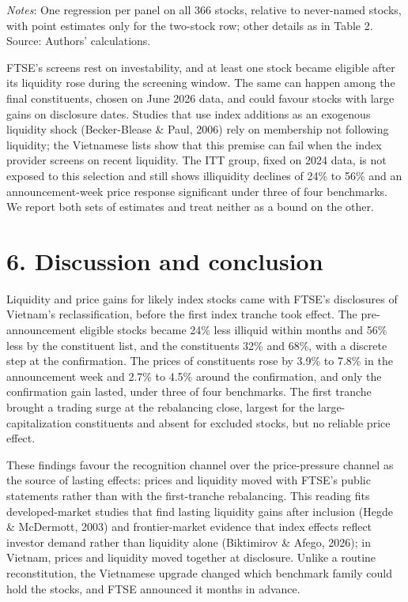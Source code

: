 \emph{Notes}: One regression per panel on all 366 stocks, relative to
never-named stocks, with point estimates only for the two-stock row;
other details as in Table 2. Source: Authors' calculations.

FTSE's screens rest on investability, and at least one stock became
eligible after its liquidity rose during the screening window. The same
can happen among the final constituents, chosen on June 2026 data, and
could favour stocks with large gains on disclosure dates. Studies that
use index additions as an exogenous liquidity shock (Becker-Blease \&
Paul, 2006) rely on membership not following liquidity; the Vietnamese
lists show that this premise can fail when the index provider screens on
recent liquidity. The ITT group, fixed on 2024 data, is not exposed to
this selection and still shows illiquidity declines of 24\% to 56\% and
an announcement-week price response significant under three of four
benchmarks. We report both sets of estimates and treat neither as a
bound on the other.

\hypertarget{discussion-and-conclusion}{%
\section{6. Discussion and conclusion}\label{discussion-and-conclusion}}

Liquidity and price gains for likely index stocks came with FTSE's
disclosures of Vietnam's reclassification, before the first index
tranche took effect. The pre-announcement eligible stocks became 24\%
less illiquid within months and 56\% less by the constituent list, and
the constituents 32\% and 68\%, with a discrete step at the
confirmation. The prices of constituents rose by 3.9\% to 7.8\% in the
announcement week and 2.7\% to 4.5\% around the confirmation, and only
the confirmation gain lasted, under three of four benchmarks. The first
tranche brought a trading surge at the rebalancing close, largest for
the large-capitalization constituents and absent for excluded stocks,
but no reliable price effect.

These findings favour the recognition channel over the price-pressure
channel as the source of lasting effects: prices and liquidity moved
with FTSE's public statements rather than with the first-tranche
rebalancing. This reading fits developed-market studies that find
lasting liquidity gains after inclusion (Hegde \& McDermott, 2003) and
frontier-market evidence that index effects reflect investor demand
rather than liquidity alone (Biktimirov \& Afego, 2026); in Vietnam,
prices and liquidity moved together at disclosure. Unlike a routine
reconstitution, the Vietnamese upgrade changed which benchmark family
could hold the stocks, and FTSE announced it months in advance.

